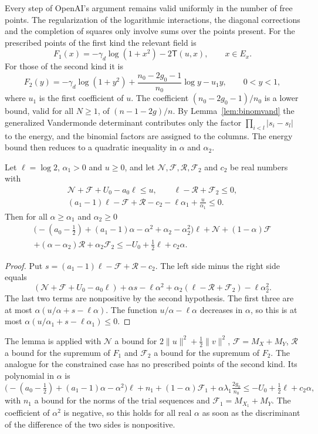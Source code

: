 Every step of OpenAI's argument remains valid uniformly in the number of free points. The regularization of
the logarithmic interactions, the diagonal corrections and the completion of squares only involve sums over
the points present. For the prescribed points of the first kind the relevant field is
\[
 F_1(x)=-\gamma_d\log(1+x^2)-2\mathsf T(u,x),\qquad x\in E_x .
\]
For those of the second kind it is
\[
 F_2(y)=-\gamma_d\log(1+y^2)+\frac{n_0-2g_0-1}{n_0}\log y-u_1y,\qquad0<y<1,
\]
where $u_1$ is the first coefficient of $u$. The coefficient $(n_0-2g_0-1)/n_0$ is a lower bound, valid for all
$N\ge1$, of $(n-1-2g)/n$. By Lemma~\ref{lem:binomvand} the generalized Vandermonde determinant contributes only
the factor $\prod_{i<l}|s_i-s_l|$ to the energy, and the binomial factors are assigned to the columns. The
energy bound then reduces to a quadratic inequality in $\alpha$ and $\alpha_2$.

\begin{lemma}\label{lem:energy-ineq}
Let $\ell=\log2$, $\alpha_1>0$ and $u\ge0$, and let $\mathcal N,\mathcal F,\mathcal R,\mathcal F_2$ and $c_2$ be real
numbers with
\begin{gather*}
 \mathcal N+\mathcal F+U_0-a_0\ell\le u,\qquad \ell-\mathcal R+\mathcal F_2\le0,\\
 (a_1-1)\ell-\mathcal F+\mathcal R-c_2-\ell\alpha_1+\frac u{\alpha_1}\le0 .
\end{gather*}
Then for all $\alpha\ge\alpha_1$ and $\alpha_2\ge0$
\begin{multline*}
 \bigl(-(a_0-\tfrac12)+(a_1-1)\alpha-\alpha^2+\alpha_2-\alpha_2^2\bigr)\ell+\mathcal N+(1-\alpha)\mathcal F\\
 +(\alpha-\alpha_2)\mathcal R+\alpha_2\mathcal F_2\le-U_0+\tfrac12\ell+c_2\alpha .
\end{multline*}
\end{lemma}

\begin{proof}
Put $s=(a_1-1)\ell-\mathcal F+\mathcal R-c_2$. The left side minus the right side equals
\[
 (\mathcal N+\mathcal F+U_0-a_0\ell)+\alpha s-\ell\alpha^2+\alpha_2(\ell-\mathcal R+\mathcal F_2)-\ell\alpha_2^2 .
\]
The last two terms are nonpositive by the second hypothesis. The first three are at most
$\alpha(u/\alpha+s-\ell\alpha)$. The function $u/\alpha-\ell\alpha$ decreases in $\alpha$, so this is at most
$\alpha(u/\alpha_1+s-\ell\alpha_1)\le0$.
\end{proof}

The lemma is applied with $\mathcal N$ a bound for $2\|u\|^2+\frac12\|v\|^2$, $\mathcal F=M_X+M_Y$,
$\mathcal R$ a bound for the supremum of $F_1$ and $\mathcal F_2$ a bound for the supremum of $F_2$. The
analogue for the constrained case has no prescribed points of the second kind. Its polynomial in $\alpha$ is
\[
 \bigl(-(a_0-\tfrac12)+(a_1-1)\alpha-\alpha^2\bigr)\ell+n_1+(1-\alpha)\mathcal F_1+\alpha\lambda_1\tfrac{2g_0}{n_0}
 \le-U_0+\tfrac12\ell+c_2\alpha,
\]
with $n_1$ a bound for the norms of the trial sequences and $\mathcal F_1=M_{X_1}+M_Y$. The coefficient of $\alpha^2$ is negative, so this holds for all real $\alpha$ as soon as the discriminant of the
difference of the two sides is nonpositive.

